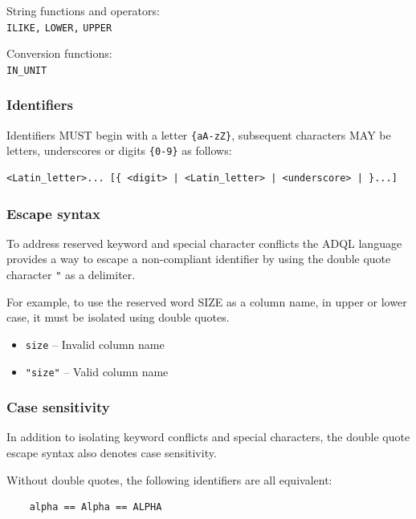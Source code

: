 \documentclass[11pt,a4paper]{ivoa}
\begin{document}
\noindent
String functions and operators:\\
\noindent
\texttt{ILIKE,} \texttt{LOWER,} \texttt{UPPER} 
\newline

\noindent
Conversion functions:\\
\noindent
\texttt{IN\_UNIT}


\subsubsection{Identifiers}
\label{sec:adql.identifiers}

Identifiers MUST begin with a letter
\verb:{aA-zZ}:, subsequent characters MAY be letters, underscores or
digits \verb:{0-9}: as follows:

\begin{verbatim}
<Latin_letter>... [{ <digit> | <Latin_letter> | <underscore> | }...]
\end{verbatim}

\subsubsection{Escape syntax}
\label{sec:adql.escape}

To address reserved keyword and special character conflicts the ADQL language
provides a way to escape a non-compliant identifier by using the double
quote character \verb:": as a delimiter.

For example, to use the reserved word SIZE as a column name, in upper or lower case,
it must be isolated using double quotes.

\begin{itemize}
    \item \verb:size: -- Invalid column name
    \item \verb:"size": -- Valid column name
\end{itemize}

\subsubsection{Case sensitivity}
\label{sec:adql.case}

In addition to isolating keyword conflicts and special characters,
the double quote escape syntax also denotes case sensitivity.

Without double quotes, the following identifiers are all equivalent:
\begin{verbatim}
    alpha == Alpha == ALPHA
\end{verbatim}
\end{document}

